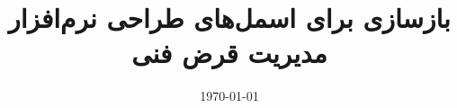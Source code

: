 \documentclass[11pt]{IUST-Book}
\title{
{\titlefont
بازسازی برای اسمل‌های طراحی نرم‌افزار
\\
مدیریت قرض فنی
}
}
\author{
\lr{Girish Suryanarayana} 
\and \lr{Ganesh Samarthyam} 
\and \lr{Tushar Sharma}
}
\affiliation{دانشگاه صنعتی امیرکبیر}
\date{\today}
\begin{document}
\frontmatter
\pagestyle{empty}
\maketitle





\pagestyle{plain}

\setcounter{tocdepth}{2}
\begin{spacing}{1.2}
\tableofcontents
%
\end{spacing}



\mainmatter
\pagestyle{fancy}










\begin{singlespace}
\small


\printacronyms
\printglossary %
\printindex
\end{singlespace}
\end{document}
